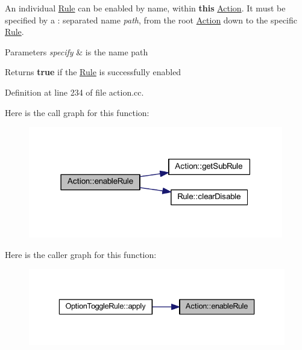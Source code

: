 An individual \mbox{\hyperlink{class_rule}{Rule}} can be enabled by name, within {\bfseries{this}} \mbox{\hyperlink{class_action}{Action}}. It must be specified by a \textquotesingle{}\+:\textquotesingle{} separated name {\itshape path}, from the root \mbox{\hyperlink{class_action}{Action}} down to the specific \mbox{\hyperlink{class_rule}{Rule}}. 
\begin{DoxyParams}{Parameters}
{\em specify} & is the name path \\
\hline
\end{DoxyParams}
\begin{DoxyReturn}{Returns}
{\bfseries{true}} if the \mbox{\hyperlink{class_rule}{Rule}} is successfully enabled 
\end{DoxyReturn}


Definition at line 234 of file action.\+cc.

Here is the call graph for this function\+:
\nopagebreak
\begin{figure}[H]
\begin{center}
\leavevmode
\includegraphics[width=315pt]{class_action_a1ed085983061bb5fac5560554af33d74_cgraph}
\end{center}
\end{figure}
Here is the caller graph for this function\+:
\nopagebreak
\begin{figure}[H]
\begin{center}
\leavevmode
\includegraphics[width=336pt]{class_action_a1ed085983061bb5fac5560554af33d74_icgraph}
\end{center}
\end{figure}
\mbox{\label{class_action_a8315ffdbefea57371464cb5f8002995d}} 
